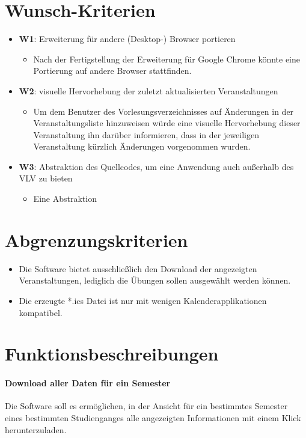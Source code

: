 \documentclass[11pt]{scrreprt}
\begin{document}
\section{Wunsch-Kriterien}
\begin{itemize}
\item \textbf{W1}: Erweiterung für andere (Desktop-) Browser portieren
    \begin{itemize}
    \item Nach der Fertigstellung der Erweiterung für Google Chrome könnte eine Portierung auf andere Browser stattfinden.
    \end{itemize}
\item \textbf{W2}: visuelle Hervorhebung der zuletzt aktualisierten Veranstaltungen
    \begin{itemize}
    \item Um dem Benutzer des Vorlesungsverzeichnisses auf \"Anderungen in der Veranstaltungsliste hinzuweisen würde eine visuelle Hervorhebung dieser Veranstaltung ihn darüber informieren, dass in der jeweiligen Veranstaltung k\"urzlich \"Anderungen vorgenommen wurden.
    \end{itemize}
\item \textbf{W3}: Abstraktion des Quellcodes, um eine Anwendung auch außerhalb des VLV zu bieten
    \begin{itemize}
    \item Eine Abstraktion
    \end{itemize}
\end{itemize}

\section{Abgrenzungskriterien}
\begin{itemize}
\item Die Software bietet ausschließlich den Download der angezeigten Veranstaltungen, lediglich die Übungen sollen ausgewählt werden können.
\item Die erzeugte *.ics Datei ist nur mit wenigen Kalenderapplikationen kompatibel.
\end{itemize}

\section{Funktionsbeschreibungen}
\paragraph{Download aller Daten für ein Semester}
Die Software soll es ermöglichen, in der Ansicht für ein bestimmtes Semester eines bestimmten Studienganges alle angezeigten Informationen mit einem Klick herunterzuladen.
\end{document}

